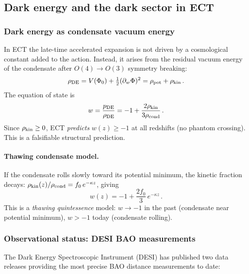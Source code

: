 \documentclass[11pt,a4paper]{article}
\numberwithin{equation}{section}
\begin{document}
\subsection{Dark energy and the dark sector in ECT}
\label{sec:dark_energy_phi}

\subsubsection{Dark energy as condensate vacuum energy}

In ECT the late-time accelerated expansion is not driven by
a cosmological constant added to the action.  Instead, it
arises from the residual vacuum energy of the condensate
after $O(4)\to O(3)$ symmetry breaking:
\begin{equation}
\rho_{\rm DE} = V(\Phi_0) + \tfrac{1}{2}(\partial_w\Phi)^2
= \rho_{\rm pot} + \rho_{\rm kin}\,.
\end{equation}
The equation of state is
\begin{equation}
w = \frac{p_{\rm DE}}{\rho_{\rm DE}}
= -1 + \frac{2\rho_{\rm kin}}{3\rho_{\rm cond}}\,.
\label{eq:w_ect}
\end{equation}
Since $\rho_{\rm kin} \geq 0$, ECT \emph{predicts}
$w(z) \geq -1$ at all redshifts (no phantom crossing).
This is a falsifiable structural prediction.

\paragraph{Thawing condensate model.}
If the condensate rolls slowly toward its potential
minimum, the kinetic fraction decays:
$\rho_{\rm kin}(z)/\rho_{\rm cond} = f_0\,e^{-\kappa z}$,
giving
\begin{equation}
w(z) = -1 + \frac{2f_0}{3}\,e^{-\kappa z}\,.
\label{eq:w_thaw}
\end{equation}
This is a \emph{thawing quintessence} model: $w \to -1$
in the past (condensate near potential minimum),
$w > -1$ today (condensate rolling).

\subsubsection{Observational status: DESI BAO measurements}

The Dark Energy Spectroscopic Instrument (DESI) has
published two data releases providing the most precise
BAO distance measurements to date:
\end{document}
